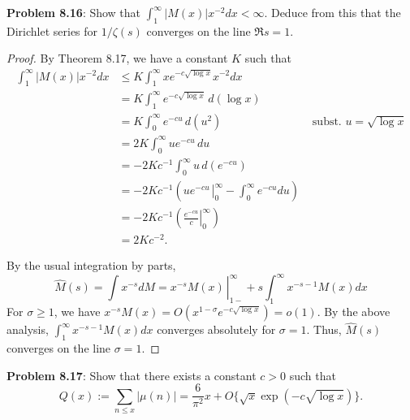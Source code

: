 \documentclass[12pt]{article}
\newcommand{\Mhat}{\widehat{M}}
\begin{document}
\fi

\textbf{Problem 8.16}: Show that $\int_1^\infty |M(x)| x^{-2} dx < \infty$. Deduce from this that the Dirichlet series for $1/\zeta(s)$ converges on the line $\Re s = 1$.

\begin{proof}
By Theorem 8.17, we have a constant $K$ such that
\begin{align*}
\int_1^\infty |M(x)| x^{-2} dx &\leq K \int_1^\infty x e^{-c\sqrt{\log x}} x^{-2} dx \\
&= K \int_1^\infty e^{-c\sqrt{\log x}} \, d(\log x)\\
&= K \int_0^\infty e^{-c u} \, d(u^2) &\text{ subst. } u = \sqrt{\log x}\\
&= 2 K \int_0^\infty u e^{-c u} \, du\\
&= - 2 K c^{-1} \int_0^\infty u \, d(e^{-c u})\\
&= - 2 K c^{-1} \left( \left. u e^{-cu}\frac{}{} \right|_0^\infty - \int_0^\infty e^{-c u} du \right)\\
&= - 2 K c^{-1} \left(\left. \frac{e^{-c u}}{c} \right|_0^\infty \right)\\
&= 2 K c^{-2}.
\end{align*}

By the usual integration by parts,
$$\Mhat(s) = \int x^{-s} dM = \left. x^{-s} M(x) \frac{}{} \right|_{1-}^\infty + s \int_1^\infty x^{-s - 1} M(x) dx$$
For $\sigma \geq 1$, we have $x^{-s} M(x) = O(x^{1-\sigma} e^{-c\sqrt{\log x}}) = o(1)$. By the above analysis, $\int_1^\infty x^{-s - 1} M(x) dx$ converges absolutely for $\sigma = 1$. Thus, $\Mhat(s)$ converges on the line $\sigma = 1$.
\end{proof}

\textbf{Problem 8.17}: Show that there exists a constant $c > 0$ such that
$$Q(x) := \sum_{n \leq x} |\mu(n)| = \frac{6}{\pi^2} x + O\{\sqrt{x} \exp(-c\sqrt{\log x})\}.$$
\end{document}
